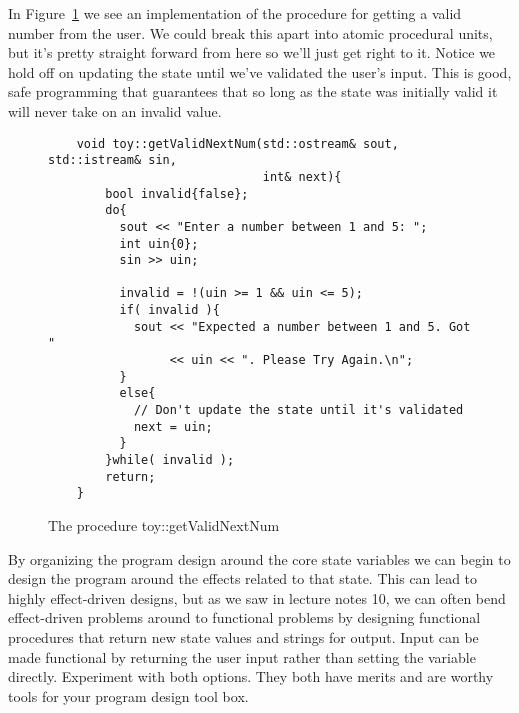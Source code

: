 \documentclass[]{tufte-handout}
\begin{document}
In Figure~\ref{ex:validNum} we see an implementation of the procedure for getting a valid number from the user. We could break this apart into atomic procedural units, but it's pretty straight forward from here so we'll just get right to it. Notice we hold off on updating the state until we've validated the user's input. This is good, safe programming that guarantees that so long as the state was initially valid it will never take on an invalid value.

\begin{figure}
  \begin{lstlisting}
    void toy::getValidNextNum(std::ostream& sout, std::istream& sin,
                              int& next){
        bool invalid{false};
        do{
          sout << "Enter a number between 1 and 5: ";
          int uin{0};
          sin >> uin;

          invalid = !(uin >= 1 && uin <= 5);
          if( invalid ){
            sout << "Expected a number between 1 and 5. Got "
                 << uin << ". Please Try Again.\n";
          }
          else{
            // Don't update the state until it's validated
            next = uin;
          }
        }while( invalid );
        return;
    }
  \end{lstlisting}
  \caption{The procedure toy::getValidNextNum}
\label{ex:validNum}
\end{figure}

By organizing the program design around the core state variables we can begin to design the program around the effects related to that state. This can lead to highly effect-driven designs, but as we saw in lecture notes 10, we can often bend effect-driven problems around to functional problems by designing functional procedures that return new state values and strings for output. Input can be made functional by returning the user input rather than setting the variable directly. Experiment with both options. They both have merits and are worthy tools for your program design tool box.
\end{document}
